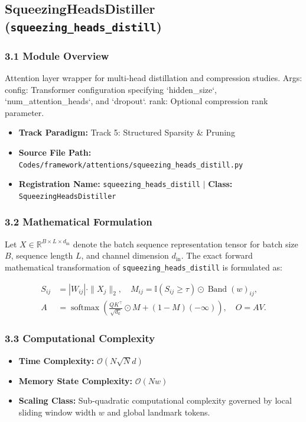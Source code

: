 \subsection{SqueezingHeadsDistiller (\texttt{squeezing\_heads\_distill})}
\label{sec:app_module_squeezing_heads_distill}

\subsubsection*{3.1 Module Overview}
Attention layer wrapper for multi-head distillation and compression studies.  Args:     config: Transformer configuration specifying `hidden\_size`, `num\_attention\_heads`, and `dropout`.     rank: Optional compression rank parameter.
\begin{itemize}
    \item \textbf{Track Paradigm:} Track 5: Structured Sparsity & Pruning
    \item \textbf{Source File Path:} \texttt{Codes/framework/attentions/squeezing\_heads\_distill.py}
    \item \textbf{Registration Name:} \texttt{squeezing\_heads\_distill} $\mid$ \textbf{Class:} \texttt{SqueezingHeadsDistiller}
\end{itemize}

\subsubsection*{3.2 Mathematical Formulation}
Let $X \in \mathbb{R}^{B \times L \times d_{\text{in}}}$ denote the batch sequence representation tensor for batch size $B$, sequence length $L$, and channel dimension $d_{\text{in}}$. The exact forward mathematical transformation of \texttt{squeezing\_heads\_distill} is formulated as:

\begin{align}
S_{ij} &= |W_{ij}| \cdot \|X_j\|_2, \quad M_{ij} = \mathbb{I}(S_{ij} \ge \tau) \odot \operatorname{Band}(w)_{ij}, \\
A &= \operatorname{softmax}\left(\frac{Q K^\top}{\sqrt{d_k}} \odot M + (1 - M)(-\infty)\right), \quad O = A V.
\end{align}


\subsubsection*{3.3 Computational Complexity}
\begin{itemize}
    \item \textbf{Time Complexity:} $\mathcal{O}(N \sqrt{N} d)$
    \item \textbf{Memory State Complexity:} $\mathcal{O}(N w)$
    \item \textbf{Scaling Class:} Sub-quadratic computational complexity governed by local sliding window width $w$ and global landmark tokens.
\end{itemize}

